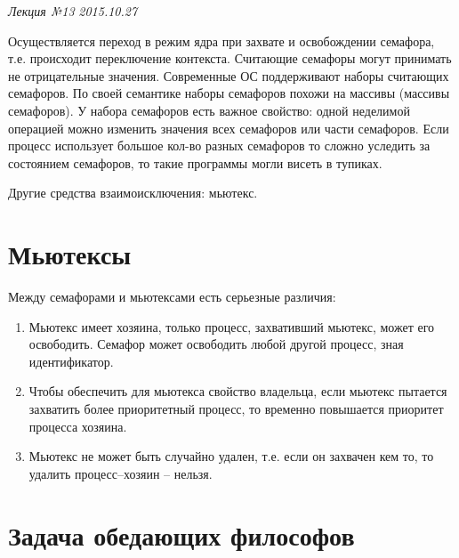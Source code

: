 \clearpage
\begin{flushright}
	\textit{Лекция №13}
	\textit{2015.10.27}
\end{flushright}


Осуществляется переход в режим ядра при захвате и освобождении семафора, т.е. происходит переключение контекста.
Считающие семафоры могут принимать не отрицательные значения. Современные ОС поддерживают наборы считающих семафоров. По своей семантике наборы семафоров похожи на массивы (массивы семафоров). У набора семафоров есть важное свойство: одной неделимой операцией можно изменить значения всех семафоров или части семафоров.
Если процесс использует большое кол-во разных семафоров то сложно уследить за состоянием семафоров, то такие программы могли висеть в тупиках.

Другие средства взаимоисключения: мьютекс.

\section{Мьютексы}

Между семафорами и мьютексами есть серьезные различия:
\begin{enumerate}
    \item Мьютекс имеет хозяина, только процесс, захвативший мьютекс, может его освободить. Семафор может освободить любой другой процесс, зная идентификатор.
    \item Чтобы обеспечить для мьютекса свойство владельца, если мьютекс пытается захватить более приоритетный процесс, то временно повышается приоритет процесса хозяина.
    \item Мьютекс не может быть случайно удален, т.е. если он захвачен кем то, то удалить процесс–хозяин – нельзя. 
\end{enumerate} 

\section{Задача обедающих философов}

